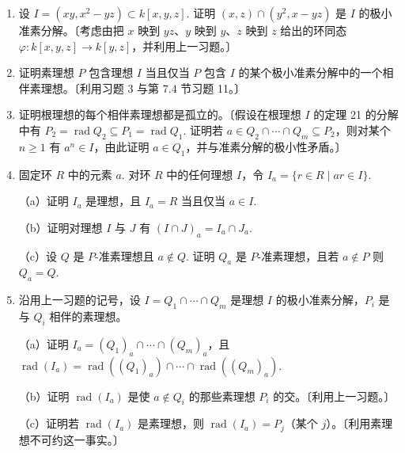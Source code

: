 \begin{enumerate}
（b）设 \(I\) 是 \(S\) 中的理想，其极小准素分解为 \(I = Q_1 \cap \cdots \cap Q_m\)，且 \(\operatorname{rad}Q_i = P_i\). 证明 \(\varphi^{-1}(I) = \varphi^{-1}(Q_1) \cap \cdots \cap \varphi^{-1}(Q_m)\)（其中 \(\operatorname{rad}\varphi^{-1}(Q_i)\) 由 \(\varphi^{-1}(P_i)\) 给出）是 \(\varphi^{-1}(I)\) 的准素分解，且当 \(\varphi\) 是满射时是极小的。

\item 设 \(I = (xy, x^2-yz) \subset k[x,y,z]\). 证明 \((x,z) \cap (y^2, x-yz)\) 是 \(I\) 的极小准素分解。〔考虑由把 \(x\) 映到 \(yz\)、\(y\) 映到 \(y\)、\(z\) 映到 \(z\) 给出的环同态 \(\varphi : k[x,y,z] \to k[y,z]\)，并利用上一习题。〕

\item 证明素理想 \(P\) 包含理想 \(I\) 当且仅当 \(P\) 包含 \(I\) 的某个极小准素分解中的一个相伴素理想。〔利用习题 3 与第 7.4 节习题 11。〕

\item 证明根理想的每个相伴素理想都是孤立的。〔假设在根理想 \(I\) 的定理 21 的分解中有 \(P_2 = \operatorname{rad}Q_2 \subseteq P_1 = \operatorname{rad}Q_1\). 证明若 \(a \in Q_2 \cap \cdots \cap Q_m \subseteq P_2\)，则对某个 \(n \geq 1\) 有 \(a^n \in I\)，由此证明 \(a \in Q_1\)，并与准素分解的极小性矛盾。〕

\item 固定环 \(R\) 中的元素 \(a\). 对环 \(R\) 中的任何理想 \(I\)，令 \(I_a = \{r \in R \mid ar \in I\}\).

（a）证明 \(I_a\) 是理想，且 \(I_a = R\) 当且仅当 \(a \in I\).

（b）证明对理想 \(I\) 与 \(J\) 有 \((I \cap J)_a = I_a \cap J_a\).

（c）设 \(Q\) 是 \(P\)-准素理想且 \(a \notin Q\). 证明 \(Q_a\) 是 \(P\)-准素理想，且若 \(a \notin P\) 则 \(Q_a = Q\).

\item 沿用上一习题的记号，设 \(I = Q_1 \cap \cdots \cap Q_m\) 是理想 \(I\) 的极小准素分解，\(P_i\) 是与 \(Q_i\) 相伴的素理想。

（a）证明 \(I_a = (Q_1)_a \cap \cdots \cap (Q_m)_a\)，且 \(\operatorname{rad}(I_a) = \operatorname{rad}((Q_1)_a) \cap \cdots \cap \operatorname{rad}((Q_m)_a)\).

（b）证明 \(\operatorname{rad}(I_a)\) 是使 \(a \notin Q_i\) 的那些素理想 \(P_i\) 的交。〔利用上一习题。〕

（c）证明若 \(\operatorname{rad}(I_a)\) 是素理想，则 \(\operatorname{rad}(I_a) = P_j\)（某个 \(j\)）。〔利用素理想不可约这一事实。〕


\end{enumerate}
